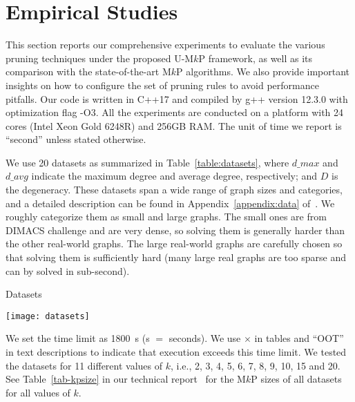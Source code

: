 \documentclass[sigconf, nonacm]{acmart}
\begin{document}
\section{Empirical Studies}\label{sec:results}
This section reports our comprehensive experiments to evaluate the various pruning techniques under the proposed U-M$k$P framework, as well as its comparison with the state-of-the-art M$k$P algorithms. We also provide important insights on how to configure the set of pruning rules to avoid performance pitfalls. Our code is written in C++17 and compiled by g++ version 12.3.0 with optimization flag -O3. All the experiments are conducted on a platform with 24 cores (Intel Xeon Gold 6248R) and 256GB RAM. The unit of time we report is ``second'' unless stated otherwise.

\vspace{1mm}
We use 20 datasets as summarized in Table~\ref{table:datasets}, where $d\_max$ and $d\_avg$ indicate the maximum degree and average degree, respectively; and $D$ is the degeneracy. 
These datasets span a wide range of graph sizes and categories, and a detailed description can be found in Appendix~\ref{appendix:data} of~\cite{tech_report}. 
We roughly categorize them as small and large graphs. The small ones are from DIMACS challenge and are very dense, so solving them is generally harder than the other real-world graphs. The large real-world graphs are carefully chosen so that solving them is sufficiently hard (many large real graphs are too sparse and can by solved in sub-second). 

\begin{table}[t]
  \caption{Datasets}\label{table:datasets}
  \vspace{-3mm}
  \texttt{[image: datasets]}
\end{table}

We set the time limit as 1800~s (s $=$ seconds). We use $\times$ in tables and ``OOT'' in text descriptions to indicate that execution exceeds this time limit. We tested the datasets for 11 different values of $k$, i.e., 2, 3, 4, 5, 6, 7, 8, 9, 10, 15 and 20. 
See Table~\ref{tab-kpsize} in our technical report~\cite{tech_report} for the M$k$P sizes of all datasets for all values of $k$.
\end{document}
